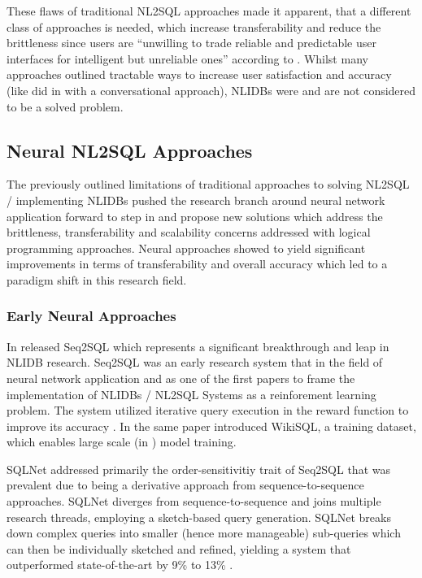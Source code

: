 \documentclass{article}
\begin{document}
These flaws of traditional NL2SQL approaches made it apparent, that a different class of approaches is needed, which 
increase transferability and reduce the brittleness since users are ``unwilling to trade reliable and predictable user 
interfaces for intelligent but unreliable ones'' according to \cite{NLIDBTheory}. Whilst many approaches outlined tractable 
ways to increase user satisfaction and accuracy (like \citeauthor*{Rendezvous} did in \citeyear{Rendezvous} with a 
conversational approach), NLIDBs were and are not considered to be a solved problem.

\subsection{Neural NL2SQL Approaches}

The previously outlined limitations of traditional approaches to solving NL2SQL / implementing NLIDBs pushed the research
branch around neural network application forward to step in and propose new solutions which address the brittleness, 
transferability and scalability concerns addressed with logical programming approaches. Neural approaches showed to yield
significant improvements in terms of transferability and overall accuracy which led to a paradigm shift in this research
field.

\subsubsection{Early Neural Approaches}

In \citeyear{Seq2SQL} \citeauthor*{Seq2SQL} released Seq2SQL which represents a significant breakthrough and leap in NLIDB 
research. Seq2SQL was an early research system that in the field of neural network application and as one of the first papers
to frame the implementation of NLIDBs / NL2SQL Systems as a reinforement learning problem. The system utilized iterative query 
execution in the reward function to improve its accuracy \citep{Seq2SQL}. In the same paper \citeauthor*{Seq2SQL} introduced 
WikiSQL, a training dataset, which enables large scale (in \citeyear{Seq2SQL}) model training.

SQLNet \citep{SQLNet} addressed primarily the order-sensitivitiy trait of Seq2SQL \citep{Seq2SQL} that was prevalent due to being
a derivative approach from sequence-to-sequence approaches. SQLNet diverges from sequence-to-sequence and joins multiple research 
threads, employing a sketch-based query generation. SQLNet breaks down complex queries into smaller (hence more manageable)
sub-queries which can then be individually sketched and refined, yielding a system that outperformed state-of-the-art by 9\% 
to 13\% \citep{SQLNet}.
\end{document}
